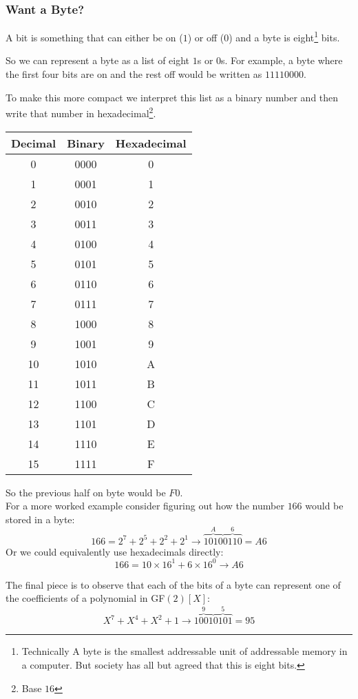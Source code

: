\subsubsection{Want a Byte?}
A bit is something that can either be on ($1$) or off ($0$) and a byte is eight\footnote{
	Technically A byte is the smallest addressable unit of addressable memory in a computer.
	But society has all but agreed that this is eight bits.
	}
	bits. 

So we can represent a byte as a list of eight $1$s or $0$s.
For example,
a byte where the first four bits are on and the rest off would be written as $11110000$.

To make this more compact we interpret this list as a binary number and then write that number in hexadecimal\footnote{Base $16$}.
\begin{center}
\begin{tabular}{|c|cc|}
	\hline
	Decimal&Binary&Hexadecimal\\
	\hline
	0&0000&0\\
	1&0001&1\\
	2&0010&2\\
	3&0011&3\\
	4&0100&4\\
	5&0101&5\\
	6&0110&6\\
	7&0111&7\\
	8&1000&8\\
	9&1001&9\\
	10&1010&A\\
	11&1011&B\\
	12&1100&C\\
	13&1101&D\\
	14&1110&E\\
	15&1111&F\\
	\hline
\end{tabular}
\end{center}
So the previous half on byte would be $F0$.
\\

For a more worked example consider figuring out how the number $166$ would be stored in a byte:
\[166 = 2^7+2^5+2^2+2^1 \rightarrow \overbrace{1010}^A\overbrace{0110}^6 = A6\]
Or we could equivalently use hexadecimals directly:
\[166 =  10\times16^1+6\times16^0 \rightarrow A6\]

The final piece is to observe that each of the bits of a byte can represent one of the coefficients of a polynomial in GF$(2)[X]$:
\[X^7+X^4+X^2+1 \rightarrow \overbrace{1001}^9\overbrace{0101}^5 = 95\]

